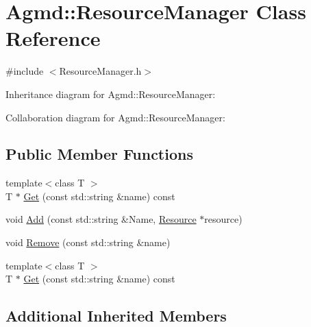 \hypertarget{class_agmd_1_1_resource_manager}{\section{Agmd\+:\+:Resource\+Manager Class Reference}
\label{class_agmd_1_1_resource_manager}
}


{\ttfamily \#include $<$Resource\+Manager.\+h$>$}



Inheritance diagram for Agmd\+:\+:Resource\+Manager\+:


Collaboration diagram for Agmd\+:\+:Resource\+Manager\+:
\subsection*{Public Member Functions}
\begin{DoxyCompactItemize}
\item 
{\footnotesize template$<$class T $>$ }\\T $\ast$ \hyperlink{class_agmd_1_1_resource_manager_a65c6954a3b27b8063db15a0e4a6e2961}{Get} (const std\+::string \&name) const 
\item 
void \hyperlink{class_agmd_1_1_resource_manager_aa44090dde0e49fd81cc8b441b2efcbb0}{Add} (const std\+::string \&Name, \hyperlink{class_agmd_1_1_resource}{Resource} $\ast$resource)
\item 
void \hyperlink{class_agmd_1_1_resource_manager_a8f359ed7f1782fd8ca010544c60af235}{Remove} (const std\+::string \&name)
\item 
{\footnotesize template$<$class T $>$ }\\T $\ast$ \hyperlink{class_agmd_1_1_resource_manager_a63378f2bc8397d64df3dcfaad103b620}{Get} (const std\+::string \&name) const 
\end{DoxyCompactItemize}
\subsection*{Additional Inherited Members}


